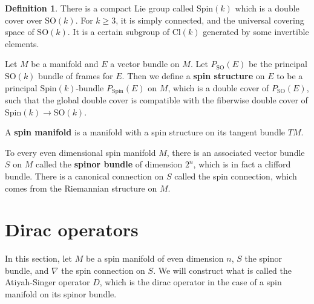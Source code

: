 \documentclass[11pt, reqno]{article}
\theoremstyle{plain}
\theoremstyle{definition}
\newtheorem*{definition}{Definition}
\theoremstyle{remark}
\begin{document}
\begin{definition}
    There is a compact Lie group called $\text{Spin}(k)$ which is a double cover over $\text{SO}(k)$. For 
    $k \geq 3$, it is simply connected, and the universal covering space of $\text{SO}(k)$. It is a certain
    subgroup of $\text{Cl}(k)$ generated by some invertible elements. 

    Let $M$ be a manifold and $E$ a vector bundle on $M$. Let $P_{\text{SO}}(E)$ be the principal $\text{SO}(k)$
    bundle of frames for $E$. Then we define a \textbf{spin structure} on $E$ to be a principal $\text{Spin}(k)$-bundle
    $P_{\text{Spin}}(E)$ on $M$, which is a double cover of $P_{\text{SO}}(E)$, such that the global double
    cover is compatible with the fiberwise double cover of $\text{Spin}(k) \to \text{SO}(k)$. 

    A \textbf{spin manifold} is a manifold with a spin structure on its tangent bundle $TM$. 

    To every even dimensional spin manifold $M$, there is an associated vector bundle $S$ on $M$ called the 
    \textbf{spinor bundle} of dimension $2^n$, which is in fact a clifford bundle. There is a 
    canonical connection on $S$ called the spin connection, which comes from the Riemannian structure on $M$. 
\end{definition}

\section{Dirac operators}

In this section, let $M$ be a spin manifold of even dimension $n$, $S$ the spinor bundle, and $\nabla$ the 
spin connection on $S$. We will construct what is called the Atiyah-Singer operator $D$, which is the
dirac operator in the case of a spin manifold on its spinor bundle. 
\end{document}
